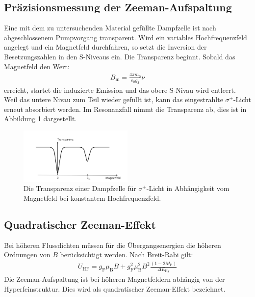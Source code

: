 \subsection{Präzisionsmessung der Zeeman-Aufspaltung}
Eine mit dem zu untersuchenden Material gefüllte Dampfzelle ist nach abgeschlossenem Pumpvorgang transparent.
Wird ein variables Hochfrequenzfeld angelegt und ein Magnetfeld durchfahren, so setzt die Inversion der Besetzungszahlen in den S-Niveaus ein. Die Transparenz
beginnt. Sobald das Magnetfeld den Wert:
\begin{align}
  B_\mathrm{m}=\frac{4\pi m_\mathrm{0}}{e_\mathrm{0}g_\mathrm{J}}\nu \label{eqn:keineahnung}
\end{align}
erreicht, startet die induzierte Emission und das obere S-Nivau wird
entleert. Weil das untere Nivau zum Teil wieder gefüllt ist, kann das
eingestrahlte $\sigma^+$-Licht erneut absorbiert werden.
Im Resonanzfall nimmt die Transparenz ab, dies ist in Abbildung \ref{fig:Transparenz}
dargestellt.
\begin{figure}
    \centering
    \includegraphics[width=0.5\textwidth]{transparenz.PNG}
    \caption{Die Transparenz einer Dampfzelle für $\sigma^+$-Licht in Abhängigkeit vom Magnetfeld
    bei konstantem Hochfrequenzfeld.\cite{skript}}
    \label{fig:Transparenz}
\end{figure}

\subsection{Quadratischer Zeeman-Effekt}
Bei höheren Flussdichten müssen für die Übergangsenergien die höheren Ordnungen von $B$ berücksichtigt werden. Nach Breit-Rabi gilt:
\begin{align}
  U_\mathrm{HF}=g_\mathrm{F}\mu_\mathrm{B}B+ g^2_\mathrm{F}\mu^2_\mathrm{B}B^2\frac{(1-2M_\mathrm{F})}{\Delta E_\mathrm{Hy}}
\end{align}
Die Zeeman-Aufspaltung ist bei höheren Magnetfeldern abhängig von der Hyperfeinstruktur. Dies wird als quadratischer Zeeman-Effekt bezeichnet.
